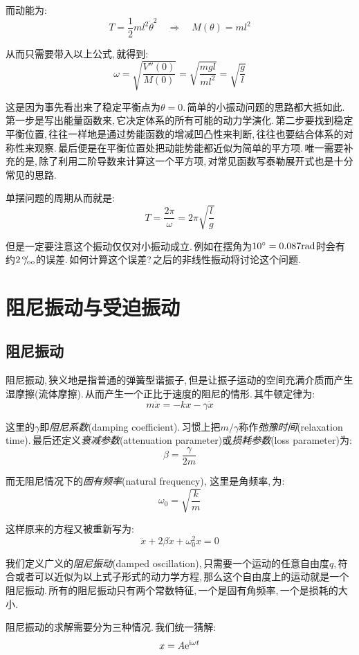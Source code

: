 而动能为:
\[T=\frac{1}{2}ml^2\dot{\theta}^2\quad \Rightarrow\quad M(\theta)=ml^2\]

从而只需要带入以上公式,\,就得到:
\[\omega=\sqrt{\frac{V''(0)}{M(0)}}=\sqrt{\frac{mgl}{ml^2}}=\sqrt{\frac{g}{l}}\]

这是因为事先看出来了稳定平衡点为$\theta=0$.\,简单的小振动问题的思路都大抵如此.\,第一步是写出能量函数来,\,它决定体系的所有可能的动力学演化.\,第二步要找到稳定平衡位置,\,往往一样地是通过势能函数的增减凹凸性来判断,\,往往也要结合体系的对称性来观察.\,最后便是在平衡位置处把动能势能都近似为简单的平方项.\,唯一需要补充的是,\,除了利用二阶导数来计算这一个平方项,\,对常见函数写泰勒展开式也是十分常见的思路.

单摆问题的周期从而就是:
\[T=\frac{2\pi}{\omega}=2\pi\sqrt{\frac{l}{g}}\]

但是一定要注意这个振动仅仅对小振动成立.\,例如在摆角为$10^\circ=0.087{\rm rad}$时会有约$2{\,}^\text{o}\mkern-5mu/\mkern-3mu_\text{oo}$的误差.\,如何计算这个误差?\,之后的非线性振动将讨论这个问题.


\section{阻尼振动与受迫振动}

\subsection{阻尼振动}

阻尼振动,\,狭义地是指普通的弹簧型谐振子,\,但是让振子运动的空间充满介质而产生湿摩擦(流体摩擦).\,从而产生一个正比于速度的阻尼的情形.\,其牛顿定律为:
\[m\ddot{x}=-kx-\gamma \dot{x}\]

这里的$\gamma$即\emph{阻尼系数}(damping coefficient).\,习惯上把$m/\gamma$称作\emph{弛豫时间}(relaxation time).\,最后还定义\emph{衰减参数}(attenuation parameter)或\emph{损耗参数}(loss parameter)为:
\[\beta=\frac{\gamma}{2m}\]

而无阻尼情况下的\emph{固有频率}(natural frequency), 这里是角频率,\,为:
\[\omega_0=\sqrt{\frac{k}{m}}\]

这样原来的方程又被重新写为:
\[\ddot{x}+2\beta \dot{x}+\omega_0^2 x=0\]

我们定义广义的\emph{阻尼振动}(damped oscillation),\,只需要一个运动的任意自由度$q$,\,符合或者可以近似为以上式子形式的动力学方程,\,那么这个自由度上的运动就是一个阻尼振动.\,所有的阻尼振动只有两个常数特征,\,一个是固有角频率,\,一个是损耗的大小.

\vspace{1cm}
阻尼振动的求解需要分为三种情况.\,我们统一猜解:
\[x=A{\rm e}^{{\rm i}\omega t}\]

